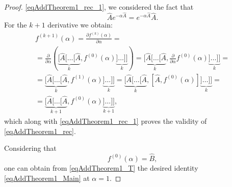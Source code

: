 \begin{theorem}
\begin{proof}
\eqref{eqAddTheorem1_rec_1}, we considered the fact that 
\begin{equation}
\hat{A}e^{-\alpha\hat{A}} = e^{-\alpha\hat{A}} \hat{A}.
\nonumber
\end{equation}
For the $k+1$ derivative we obtain:
\begin{eqnarray}
f^{(k + 1)}\left(\alpha\right) = 
\frac{\partial f^{(k)}\left(\alpha\right)}{\partial \alpha} =
\nonumber \\
=\frac{\partial }{\partial \alpha}
\left(
\underbrace{
[\hat{A}[\dots[\hat{A}}_{k},
f^{(0)}\left(\alpha\right)
\underbrace{]\dots]]}_{k} \right) =  
\underbrace{
[\hat{A}[\dots[\hat{A}}_{k},
\frac{\partial }{\partial \alpha}f^{(0)}\left(\alpha\right)
\underbrace{]\dots]]}_{k} =
\nonumber \\
= 
\underbrace{
[\hat{A}[\dots[\hat{A}}_{k},
f^{(1)}\left(\alpha\right)
\underbrace{]\dots]]}_{k} =
\underbrace{
[\hat{A}[\dots[\hat{A}}_{k},
\left[\hat{A}, f^{(0)}\left(\alpha\right)\right]
\underbrace{]\dots]]}_{k} =
\nonumber \\
=
\underbrace{
[\hat{A}[\dots[\hat{A}}_{k + 1},
f^{(0)}\left(\alpha\right)
\underbrace{]\dots]]}_{k + 1},
\nonumber
\end{eqnarray}
which along with \eqref{eqAddTheorem1_rec_1} proves the validity 
of \eqref{eqAddTheorem1_rec}.

Considering that 
\begin{equation}
f^{(0)}\left(\alpha\right) = \hat{B},
\nonumber
\end{equation}
one can obtain from \eqref{eqAddTheorem1_T} the desired identity
\eqref{eqAddTheorem1_Main} at $\alpha = 1$. 
\end{proof}
\end{theorem}